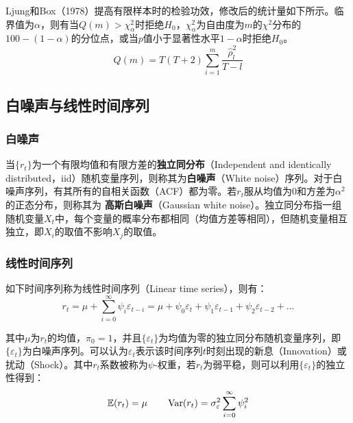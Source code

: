\documentclass[11pt]{article}
\begin{document}
Ljung和Box（1978）提高有限样本时的检验功效，修改后的统计量如下所示。临界值为$\alpha$，则有当$Q(m)>\chi_{\alpha}^{2}$时拒绝$H_0$，$\chi_{\alpha}^{2}$为自由度为$m$的$\chi^{2}$分布的$100-(1-\alpha)$的分位点，或当$p$值小于显著性水平$1-\alpha$时拒绝$H_0$。
\begin{equation*}
    Q(m) = T(T+2) \sum_{i=1}^{m} \frac{\hat{\rho}_{l}^{2}}{T-l}
\end{equation*}

\subsection{白噪声与线性时间序列}

\subsubsection{白噪声}

当$\{r_t\}$为一个有限均值和有限方差的\textbf{独立同分布}（Independent and identically distributed，iid）随机变量序列，则称其为\textbf{白噪声}（White noise）序列。对于白噪声序列，有其所有的自相关函数（ACF）都为零。若$r_t$服从均值为$0$和方差为$\alpha^{2}$的正态分布，则称其为\textbf{
高斯白噪声}（Gaussian white noise）。独立同分布指一组随机变量$X_t$中，每个变量的概率分布都相同（均值方差等相同），但随机变量相互独立，即$X_i$的取值不影响$X_j$的取值。

\subsubsection{线性时间序列}

如下时间序列称为线性时间序列（Linear time series），则有：
\begin{equation*}
    r_t = \mu + \sum_{i=0}^{\infty} \psi_i \varepsilon_{t-i} = \mu + \psi_0 \varepsilon_{t} + \psi_1 \varepsilon_{t-1} + \psi_2 \varepsilon_{t-2} + \dots
\end{equation*}

其中$\mu$为$r_t$的均值，$\pi_0=1$，并且$\{\varepsilon_t\}$为均值为零的独立同分布随机变量序列，即$\{\varepsilon_t\}$为白噪声序列。可以认为$\varepsilon_t$表示该时间序列$t$时刻出现的新息（Innovation）或扰动（Shock）。其中$r_t$系数被称为$\psi$-权重，若$r_t$为弱平稳，则可以利用$\{\varepsilon_t\}$的独立性得到：
\begin{equation*}
    \mathbb{E}(r_t) = \mu \qquad \operatorname{Var}(r_t) = \sigma_{\varepsilon}^{2}\sum_{i=0}^{\infty} \psi_{i}^{2}
\end{equation*}
\end{document}
